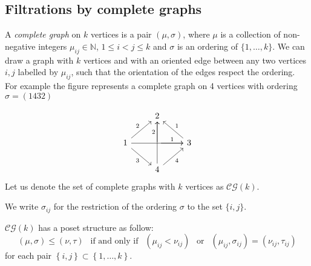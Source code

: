 \subsection{Filtrations by complete graphs}
\begin{definition}
		A \textit{complete graph} on $k$ vertices is
		a pair $(\mu,\sigma)$, where $\mu$ is a collection of non-negative integers $\mu_{ij}\in\mathbb{N}$, $1 \leq i < j \leq k$
  and $\sigma$ is an ordering of
  $\{1,\dots,k\}$.
  We can draw a graph with $k$ vertices and with an oriented edge between any two vertices $i,j$
  labelled by $\mu_{ij}$, such that the orientation of the edges respect the ordering.
  For example the figure represents a complete graph on 4 vertices with ordering $\sigma=(1432)$


\begin{equation*}
	\begin{tikzcd}
		\ & 2 & \  \\
		1 \arrow[ur,"2"] \arrow[rr] \arrow[dr,"3"']& \arrow[r,"1"] \arrow[u,"2"] & 3 \arrow[ul,"1"']  \\
		\ & 4 \arrow[ur,"4"'] \arrow[uu] & \
	\end{tikzcd}
\end{equation*}
Let us denote the set of complete graphs with $k$ vertices as $\mathcal{CG}(k)$.

We write $\sigma_{ij}$ for the restriction of the ordering $\sigma$ to the set $\{i,j\}$.
	\end{definition}

\begin{definition}
	$\mathcal{CG}(k)$ has a poset structure as follow:
	\begin{equation*}
		(\mu,\sigma)\le (\nu,\tau) \ \ \text{ if and only if } \ \ (\mu_{ij}<\nu_{ij}) \ \ \text{ or } \ \ (\mu_{ij},\sigma_{ij})= (\nu_{ij},\tau_{ij})
	\end{equation*}
	for each pair $\left\lbrace i,j\right\rbrace \subset\left\lbrace 1,\dots,k  \right\rbrace $.
\end{definition}


